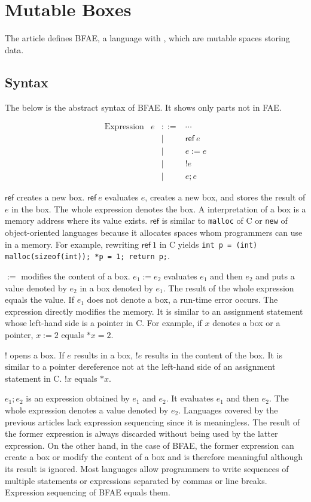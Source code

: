 \setchapterpreamble[u]{\margintoc}
\chapter{Mutable Boxes}

The article defines BFAE, a language with , which are mutable spaces
storing data.

\section{Syntax
}

The below is the abstract syntax of BFAE. It shows only parts not in FAE.

\[
\begin{array}{lrcl}
\text{Expression} & e & ::= & \cdots \\
&& | & \textsf{ref}\ e \\
&& | & e:=e \\
&& | & !e \\
&& | & e;e
\end{array}
\]

\(\textsf{ref}\) creates a new box. \(\textsf{ref}\ e\) evaluates \(e\), creates
a new box, and stores the result of \(e\) in the box. The whole expression
denotes the box. A  interpretation of a box is a memory address
where its value exists. \(\textsf{ref}\) is similar to \verb!malloc! of C or
\verb!new! of object-oriented languages because it allocates spaces whom
programmers can use in a memory. For example, rewriting \(\textsf{ref}\ 1\) in C
yields \verb!int p = (int) malloc(sizeof(int)); *p = 1; return p;!.

\(:=\) modifies the content of a box. \(e_1:=e_2\) evaluates \(e_1\) and then
\(e_2\) and puts a value denoted by \(e_2\) in a box denoted by \(e_1\). The
result of the whole expression equals the value. If \(e_1\) does not denote a
box, a run-time error occurs. The expression directly modifies the memory. It is
similar to an assignment statement whose left-hand side is a pointer
 in C. For example, if \(x\) denotes a box or a pointer,
\(x:=2\) equals \(*x=2\).

\(!\) opens a box. If \(e\) results in a box, \(!e\) results in the content of
the box. It is similar to a pointer dereference not at the left-hand side of an
assignment statement in C. \(!x\) equals \(*x\).

\(e_1;e_2\) is an expression obtained by  \(e_1\) and \(e_2\).
It evaluates \(e_1\) and then \(e_2\). The whole expression denotes a value
denoted by \(e_2\). Languages covered by the previous articles lack expression
sequencing since it is meaningless. The result of the former expression is always
discarded without being used by the latter expression. On the other hand, in the
case of BFAE, the former expression can create a box or modify the content of a
box and is therefore meaningful although its result is ignored. Most languages
allow programmers to write sequences of multiple statements or expressions
separated by commas or line breaks. Expression sequencing of BFAE equals them.

